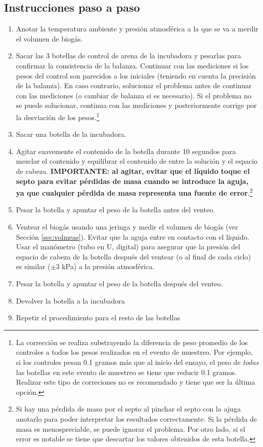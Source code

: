 \documentclass[]{article}
\begin{document}
\subsection{Instrucciones paso a paso} 
\label{sec:steps}
\begin{enumerate}
    \item Anotar la temperatura ambiente y presión atmosférica a la que se va a merdir el volumen de biogás.
    \item Sacar las 3 botellas de control de arena de la incubadora y pesarlas para confirmar la consistencia de la balanza. 
      Continuar con las mediciones si los pesos del control son parecidos a los iniciales (teniendo en cuenta la precisión de la balanza). En caso contrario, solucionar el problema antes de continuar con las mediciones (o cambiar de balanza si es necesario).
      Si el problema no se puede solucionar, continua con las mediciones y posteriormente corrige por la desviación de los pesos.\footnote{
        La corrección se realiza substrayendo la diferencia de peso promedio de los controles a todos los pesos realizados en el evento de muestreo. 
        Por ejemplo, si los controles pesan 0.1 gramos más que al inicio del ensayo, el peso de \textit{todas} las botellas en este evento de muestreo se tiene que reducir 0.1 gramos. Realizar este tipo de correciones no es recomendado y tiene que ser la última opción.
      }
    \item Sacar una botella de la incubadora.
    \item Agitar suavemente el contenido de la botella durante 10 segundos para mezclar el contenido y equilibrar el contenido de  entre la solución y el espacio de cabeza. \textbf{IMPORTANTE: al agitar, evitar que el líquido toque el septo para evitar pérdidas de masa cuando se introduce la aguja, ya que cualquier pérdida de masa representa una fuente de error}.\footnote{Si hay una pérdida de masa por el septo al pinchar el septo con la ajuga anotarlo para poder interpretar los resultados correctamente. Si la pérdida de masa es menospreciable, se puede ignorar el problema. Por otro lado, si el error es notable se tiene que descartar los valores obtenidos de esta botella.}
    \item Pesar la botella y apuntar el peso de la botella antes del venteo.
    \item Ventear el biogás usando una jeringa y medir el volumen de biogás (ver Sección \ref{sec:volmeas}). Evitar que la aguja entre en contacto con el líquido.
    Usar el manómetro (tubo en U, digital) para asegurar que la presión del espacio de cabeza de la botella después del ventear (o al final de cada ciclo) es similar ($\pm3 $ kPa) a la presión atmosférica. 
    
    \item Pesar la botella y apuntar el peso de la botella después del venteo.
    \item Devolver la botella a la incubadora
    \item Repetir el procedimiento para el resto de las botellas

\end{enumerate}
\end{document}
